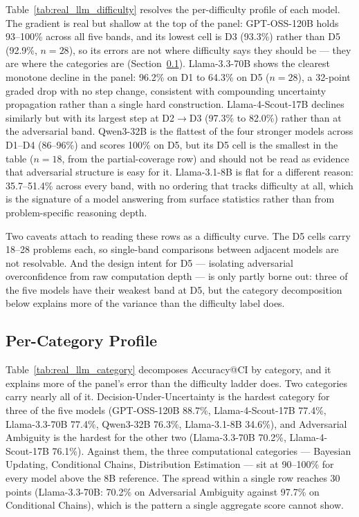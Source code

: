 \documentclass{article}
\begin{document}
Table~\ref{tab:real_llm_difficulty} resolves the per-difficulty profile of each model. The gradient is real but shallow at the top of the panel: GPT-OSS-120B holds 93--100\% across all five bands, and its lowest cell is D3 (93.3\%) rather than D5 (92.9\%, $n = 28$), so its errors are not where difficulty says they should be --- they are where the categories are (Section~\ref{sec:real_llm_category}). Llama-3.3-70B shows the clearest monotone decline in the panel: 96.2\% on D1 to 64.3\% on D5 ($n = 28$), a 32-point graded drop with no step change, consistent with compounding uncertainty propagation rather than a single hard construction. Llama-4-Scout-17B declines similarly but with its largest step at D2$\to$D3 (97.3\% to 82.0\%) rather than at the adversarial band. Qwen3-32B is the flattest of the four stronger models across D1--D4 (86--96\%) and scores 100\% on D5, but its D5 cell is the smallest in the table ($n = 18$, from the partial-coverage row) and should not be read as evidence that adversarial structure is easy for it. Llama-3.1-8B is flat for a different reason: 35.7--51.4\% across every band, with no ordering that tracks difficulty at all, which is the signature of a model answering from surface statistics rather than from problem-specific reasoning depth.

Two caveats attach to reading these rows as a difficulty curve. The D5 cells carry 18--28 problems each, so single-band comparisons between adjacent models are not resolvable. And the design intent for D5 --- isolating adversarial overconfidence from raw computation depth --- is only partly borne out: three of the five models have their weakest band at D5, but the category decomposition below explains more of the variance than the difficulty label does.

\subsection{Per-Category Profile}
\label{sec:real_llm_category}

Table~\ref{tab:real_llm_category} decomposes Accuracy@CI by category, and it explains more of the panel's error than the difficulty ladder does. Two categories carry nearly all of it. Decision-Under-Uncertainty is the hardest category for three of the five models (GPT-OSS-120B 88.7\%, Llama-4-Scout-17B 77.4\%, Llama-3.3-70B 77.4\%, Qwen3-32B 76.3\%, Llama-3.1-8B 34.6\%), and Adversarial Ambiguity is the hardest for the other two (Llama-3.3-70B 70.2\%, Llama-4-Scout-17B 76.1\%). Against them, the three computational categories --- Bayesian Updating, Conditional Chains, Distribution Estimation --- sit at 90--100\% for every model above the 8B reference. The spread within a single row reaches 30 points (Llama-3.3-70B: 70.2\% on Adversarial Ambiguity against 97.7\% on Conditional Chains), which is the pattern a single aggregate score cannot show.
\end{document}
